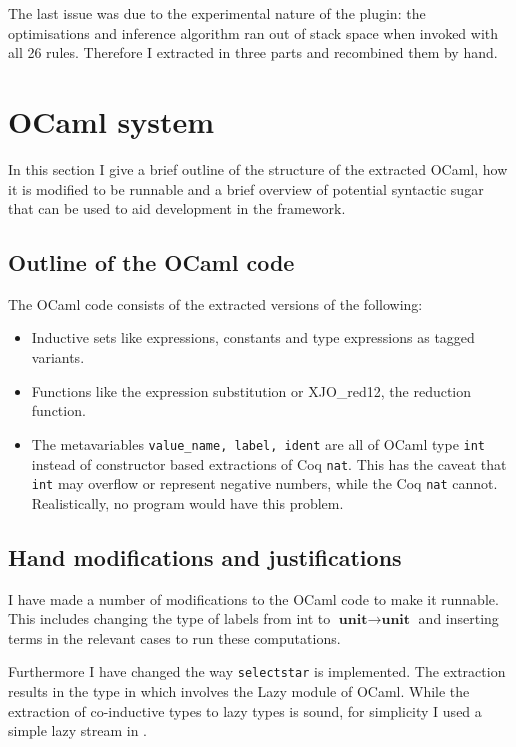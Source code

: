 \documentclass[12pt,twoside,notitlepage]{report}
\begin{document}
The last issue was due to the experimental nature of the plugin: the optimisations and inference algorithm ran out of stack space when invoked with all 26 rules. Therefore I extracted in three parts and recombined them by hand.

\section{OCaml system}
In this section I give a brief outline of the structure of the extracted OCaml, how it is modified to be runnable and a brief overview of potential syntactic sugar that can be used to aid development in the framework. 

\subsection{Outline of the OCaml code}
The OCaml code consists of the extracted versions of the following:
\begin{itemize}
\item{Inductive sets like expressions, constants and type expressions as tagged variants.}
\item{Functions like the expression substitution or XJO\_red12, the reduction function.}
\item{The metavariables \verb|value_name, label, ident| are all of OCaml type \lstinline|int| instead of constructor based extractions of Coq \lstinline[language={Coq}]|nat|. This has the caveat that \lstinline|int| may overflow or represent negative numbers, while the Coq \lstinline[language={Coq}]|nat| cannot. Realistically, no program would have this problem.}
\end{itemize}
\subsection{Hand modifications and justifications}
I have made a number of modifications to the OCaml code to make it runnable. This includes changing the type of labels from int to $ \textbf{unit}\rightarrow\textbf{unit} $ and inserting terms in the relevant cases to run these computations. 

Furthermore I have changed the way \verb|selectstar| is implemented. The extraction results in the type in  which involves the Lazy module of OCaml. While the extraction of co-inductive types to lazy types is sound, for simplicity I used a simple lazy stream in . 
\end{document}
